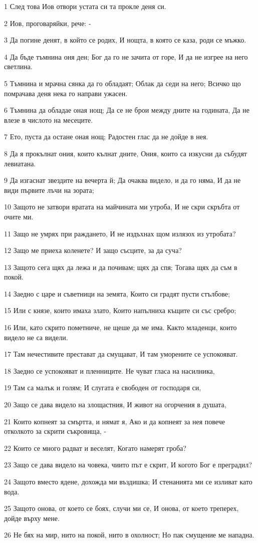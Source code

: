 \par 1 След това Иов отвори устата си та прокле деня си.
\par 2 Иов, проговаряйки, рече: -
\par 3 Да погине денят, в който се родих, И нощта, в която се каза, роди се мъжко.
\par 4 Да бъде тъмнина оня ден; Бог да го не зачита от горе, И да не изгрее на него светлина.
\par 5 Тъмнина и мрачна сянка да го обладаят; Облак да седи на него; Всичко що помрачава деня нека го направи ужасен.
\par 6 Тъмнина да обладае оная нощ; Да се не брои между дните на годината, Да не влезе в числото на месеците.
\par 7 Ето, пуста да остане оная нощ; Радостен глас да не дойде в нея.
\par 8 Да я прокълнат ония, които кълнат дните, Ония, които са изкусни да събудят левиатана.
\par 9 Да изгаснат звездите на вечерта й; Да очаква видело, и да го няма, И да не види първите лъчи на зората;
\par 10 Защото не затвори вратата на майчината ми утроба, И не скри скръбта от очите ми.
\par 11 Защо не умрях при раждането, И не издъхнах щом излязох из утробата?
\par 12 Защо ме приеха коленете? И защо съсците, за да суча?
\par 13 Защото сега щях да лежа и да почивам; щях да спя; Тогава щях да съм в покой.
\par 14 Заедно с царе и съветници на земята, Които си градят пусти стълбове;
\par 15 Или с князе, които имаха злато, Които напълниха къщите си със сребро;
\par 16 Или, като скрито пометниче, не щеше да ме има. Както младенци, които видело не са видели.
\par 17 Там нечестивите престават да смущават, И там уморените се успокояват.
\par 18 Заедно се успокояват и пленниците. Не чуват гласа на насилника,
\par 19 Там са малък и голям; И слугата е свободен от господаря си,
\par 20 Защо се дава видело на злощастния, И живот на огорчения в душата,
\par 21 Които копнеят за смъртта, и нямат я, Ако и да копнеят за нея повече отколкото за скрити съкровища, -
\par 22 Които се много радват и веселят, Когато намерят гроба?
\par 23 Защо се дава видело на човека, чиито път е скрит, И когото Бог е преградил?
\par 24 Защото вместо ядене, дохожда ми въздишка; И стенанията ми се изливат като вода.
\par 25 Защото онова, от което се боях, случи ми се, И онова, от което треперех, дойде върху мене.
\par 26 Не бях на мир, нито на покой, нито в охолност; Но пак смущение ме нападна.


